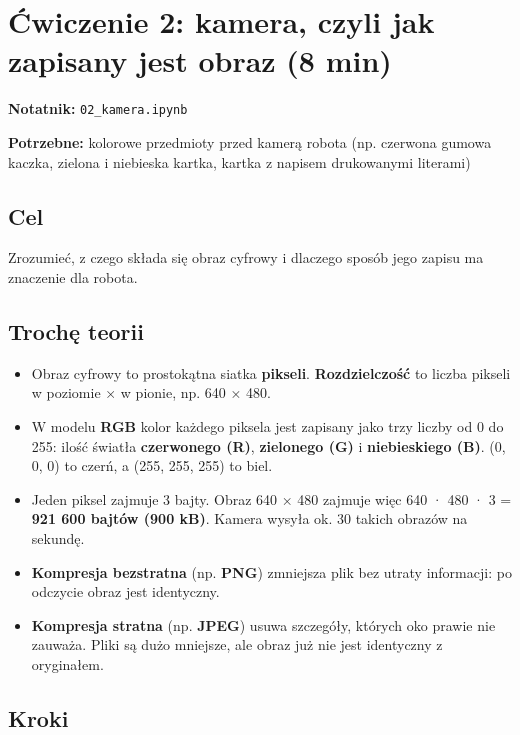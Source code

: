 \section{Ćwiczenie 2: kamera, czyli jak zapisany jest obraz (8 min)}\label{ux107wiczenie-2-kamera-czyli-jak-zapisany-jest-obraz-8-min}

\textbf{Notatnik:} \texttt{02\_kamera.ipynb}

\textbf{Potrzebne:} kolorowe przedmioty przed kamerą robota (np. czerwona gumowa kaczka, zielona i niebieska kartka, kartka z napisem drukowanymi literami)

\subsection{Cel}\label{cel}

Zrozumieć, z czego składa się obraz cyfrowy i dlaczego sposób jego zapisu ma znaczenie dla robota.

\subsection{Trochę teorii}\label{trochux119-teorii}

\begin{itemize}
\tightlist
\item
  Obraz cyfrowy to prostokątna siatka \textbf{pikseli}. \textbf{Rozdzielczość} to liczba pikseli w poziomie × w pionie, np. 640 × 480.
\item
  W modelu \textbf{RGB} kolor każdego piksela jest zapisany jako trzy liczby od 0 do 255: ilość światła \textbf{czerwonego (R)}, \textbf{zielonego (G)} i \textbf{niebieskiego (B)}. (0, 0, 0) to czerń, a (255, 255, 255) to biel.
\item
  Jeden piksel zajmuje 3 bajty. Obraz 640 × 480 zajmuje więc 640 · 480 · 3 = \textbf{921 600 bajtów (900 kB)}. Kamera wysyła ok. 30 takich obrazów na sekundę.
\item
  \textbf{Kompresja bezstratna} (np. \textbf{PNG}) zmniejsza plik bez utraty informacji: po odczycie obraz jest identyczny.
\item
  \textbf{Kompresja stratna} (np. \textbf{JPEG}) usuwa szczegóły, których oko prawie nie zauważa. Pliki są dużo mniejsze, ale obraz już nie jest identyczny z oryginałem.
\end{itemize}

\subsection{Kroki}\label{kroki}

